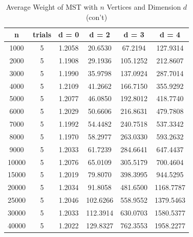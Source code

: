 \documentclass[12pt]{article}
\begin{document}
\begin{table}[h!]
\centering
\caption{Average Weight of MST with $n$ Vertices and Dimension $d$ (con't)}
\renewcommand{\arraystretch}{1.1}
{\setlength{\tabcolsep}{15pt}
\begin{tabular} {c | c | c | c | c | c  }
n&trials&d = 0&d = 2&d = 3&d = 4\\ \hline
1000&5&1.2058&20.6530&67.2194&127.9314\\
2000&5&1.1908&29.1936&105.1252&212.8607\\
3000&5&1.1990&35.9798&137.0924&287.7014\\
4000&5&1.2109&41.2662&166.7150&355.9292\\
5000&5&1.2077&46.0850&192.8012&418.7740\\
6000&5&1.2029&50.6606&216.8631&479.7808\\
7000&5&1.1992&54.4482&240.7518&537.3342\\
8000&5&1.1970&58.2977&263.0330&593.2632\\
9000&5&1.2033&61.7239&284.6641&647.4437\\
10000&5&1.2076&65.0109&305.5179&700.4604\\
15000&5&1.2019&79.8070&398.3995&944.5295\\
20000&5&1.2034&91.8058&481.6500&1168.7787\\
25000&5&1.2046&102.6266&558.9552&1379.5463\\
30000&5&1.2033&112.3914&630.0703&1580.5377\\
40000&5&1.2022&129.8327&762.3553&1958.2277\\
\end{tabular}}
\label{table:2}
\end{table}

\pagebreak
\end{document}
